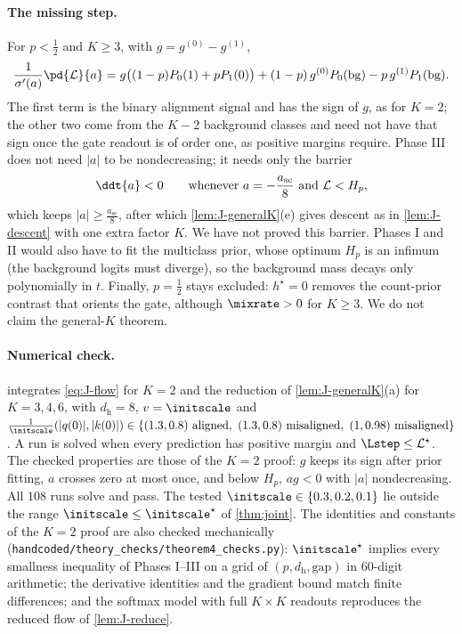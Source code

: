 \paragraph{The missing step.} For $p<\frac{1}{2}$ and $K\ge3$, with $g=g^{(0)}-g^{(1)}$,
\[
 \frac{1}{\sigma'(a)}\pd{\mathcal L}{a}=g\bigl((1-p)P_0(1)+pP_1(0)\bigr)+(1-p)\,g^{(0)}P_0(\mathrm{bg})-p\,g^{(1)}P_1(\mathrm{bg}).
\]
The first term is the binary alignment signal and has the sign of $g$, as for $K=2$; the other two come from the $K-2$ background classes and
need not have that sign once the gate readout is of order one, as positive margins require. Phase III does not need $|a|$ to be
nondecreasing; it needs only the barrier
\[
 \ddt{a}<0\qquad\text{whenever } a=-\frac{a_{\mathrm{sc}}}{8}\ \text{and}\ \mathcal L<H_p,
\]
which keeps $|a|\ge\frac{a_{\mathrm{sc}}}{8}$, after which \cref{lem:J-generalK}(e) gives descent as in \cref{lem:J-descent} with one extra factor $K$. We have
not proved this barrier. Phases I and II would also have to fit the multiclass prior, whose optimum $H_p$ is an infimum (the background logits
must diverge), so the background mass decays only polynomially in $t$. Finally, $p=\frac{1}{2}$ stays excluded: $h^\star=0$ removes the
count-prior contrast that orients the gate, although $\mixrate>0$ for $K\ge3$. We do not claim the general-$K$ theorem.

\paragraph{Numerical check.}  integrates \cref{eq:J-flow} for $K=2$ and the reduction of \cref{lem:J-generalK}(a) for $K=3,4,6$, with
$d_{\mathrm h}=8$, $v=\initscale$ and $\frac{1}{\initscale}(|q(0)|,|k(0)|)\in\{(1.3,0.8)\text{ aligned},\ (1.3,0.8)\text{ misaligned},\ (1,0.98)\text{ misaligned}\}$. A run is solved when every
prediction has positive margin and $\Lstep\le \mathcal L^\star$. The checked properties are those of the $K=2$ proof: $g$ keeps its sign after prior
fitting, $a$ crosses zero at most once, and below $H_p$, $ag<0$ with $|a|$ nondecreasing. All $108$ runs solve and pass. The tested
$\initscale\in\{0.3,0.2,0.1\}$ lie outside the range $\initscale\le\initscale^\star$ of \cref{thm:joint}. The identities and constants of the $K=2$ proof are also checked mechanically
(\texttt{handcoded/theory\_checks/theorem4\_checks.py}): $\initscale^\star$ implies every smallness inequality of Phases I--III on a grid of
$(p,d_{\mathrm h},\mathrm{gap})$ in $60$-digit arithmetic; the derivative identities and the gradient bound match finite differences; and the
softmax model with full $K\times K$ readouts reproduces the reduced flow of \cref{lem:J-reduce}.

